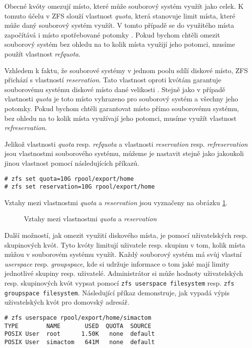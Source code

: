 Obecné kvóty omezují místo, které může souborový systém využít jako celek. K tomuto účelu v ZFS slouží vlastnost \emph{quota}, která stanovuje limit místa, které může daný souborový systém využít. V tomto případě se do využitého místa započítává i místo spotřebované potomky \cite{quotas}. Pokud bychom chtěli omezit souborový systém bez ohledu na to kolik místa využijí jeho potomci, musíme použít vlastnost \emph{refquota}.

Vzhledem k faktu, že souborové systémy v jednom poolu sdílí diskové místo, ZFS přichází s vlastností \emph{reservation}. Tato vlastnost oproti kvótám garantuje souborovému systému diskové místo dané velikosti \cite{quotas}. Stejně jako v případě vlastnosti \emph{quota} je toto místo vyhrazeno pro souborový systém a všechny jeho potomky. Pokud bychom chtěli garantovat místo přímo souborovému systému, bez ohledu na to kolik místa využívají jeho potomci, musíme využít vlastnost \emph{refreservation}.

Jelikož vlastnosti \emph{quota} resp. \emph{refquota} a vlastnosti \emph{reservation} resp. \emph{refreservation} jsou vlastnostmi souborového systému, můžeme je nastavit stejně jako jakoukoli jinou vlastnost pomocí následujících příkazů.
\begin{verbatim}
# zfs set quota=10G rpool/export/home
# zfs set reservation=10G rpool/export/home
\end{verbatim}

Vztahy mezi vlastnostmi \emph{quota} a \emph{reservation} jsou vyznačeny na obrázku \ref{quotavsreserv}.
\begin{figure}[h]
    \caption{Vztahy mezi vlastnostmi \emph{quota} a \emph{reservation}}
    \label{quotavsreserv}
\end{figure}

Další možností, jak omezit využití diskového místa, je pomocí uživatelských resp. skupinových kvót. Tyto kvóty limitují uživatele resp. skupinu v tom, kolik místa můžou v souborovém systému využít. Každý souborový systém má svůj vlastní \emph{userspace} resp. \emph{groupspace}, kde si udržuje informace o tom jaké mají limity jednotlivé skupiny resp. uživatelé.
Administrátor si může hodnoty uživatelských resp. skupinových kvót vypsat pomocí \verb|zfs userspace filesystem| resp. \verb|zfs groupspace filesystem|. Následující příkaz demonstruje, jak vypadá výpis uživatelských kvót pro domovský adresář.
\begin{verbatim}
# zfs userspace rpool/export/home/simactom
TYPE        NAME       USED  QUOTA  SOURCE
POSIX User  root      1.50K   none  default
POSIX User  simactom   641M   none  default
\end{verbatim}

